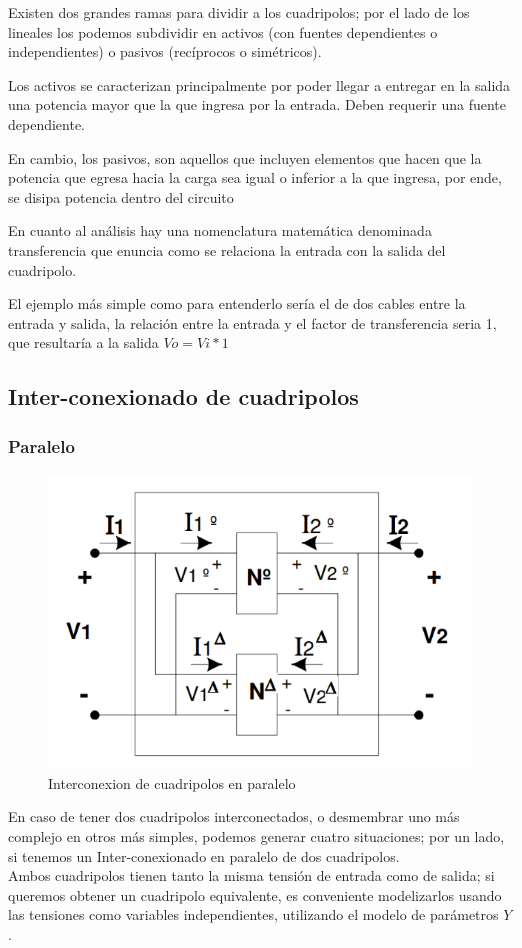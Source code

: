 \documentclass[../main.tex]{subfiles}
\begin{document}
{	Existen dos grandes ramas para dividir a los cuadripolos; 
	por el lado de los lineales los podemos subdividir en activos 
	(con fuentes dependientes o independientes) o pasivos (recíprocos o simétricos).

	Los activos se caracterizan principalmente por poder llegar a entregar en la salida
	una potencia mayor que la que ingresa por la entrada.
	Deben requerir una fuente dependiente.

	En cambio, los pasivos, son aquellos que incluyen elementos que hacen que la potencia
	que egresa hacia la carga sea igual o inferior a la que ingresa, por ende, se disipa
	potencia dentro del circuito

	En cuanto al análisis hay una nomenclatura matemática denominada
	transferencia que enuncia como se relaciona la entrada con la salida
	del cuadripolo. 

	El ejemplo más simple como para entenderlo sería el de dos cables entre
	la entrada y salida, la relación entre la entrada y el factor de
	transferencia seria 1, que resultaría a la salida $Vo=Vi*1$

	\subsection{Inter-conexionado de cuadripolos}		
		\subsubsection{Paralelo}
		\begin{figure}[H]
			\centering
			\includegraphics[width=\textwidth]{imagen3.png}
			\caption{Interconexion de cuadripolos en paralelo}
		\end{figure}
		En caso de tener dos cuadripolos interconectados, o desmembrar uno 
		más complejo en otros más simples, podemos generar cuatro situaciones;
		por un lado, si tenemos un Inter-conexionado en paralelo de dos cuadripolos.\\
		Ambos cuadripolos tienen tanto la misma tensión de entrada como de salida; 
		si queremos obtener un cuadripolo equivalente, es conveniente modelizarlos
		usando las tensiones como variables independientes, 
		utilizando el modelo de parámetros $Y$.

}
\end{document}
